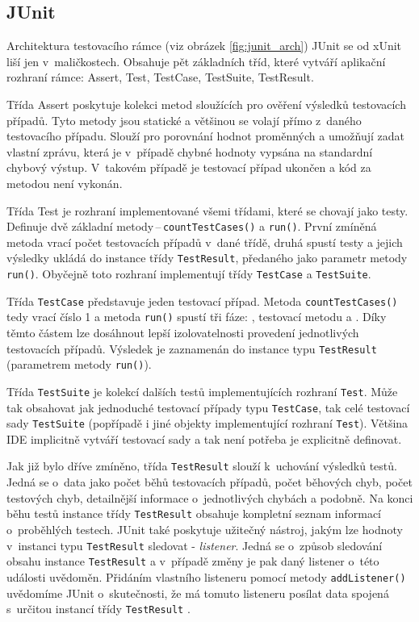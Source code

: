     \subsection{JUnit}
    \label{section:JUnit}
    Architektura testovacího rámce (viz obrázek \ref{fig:junit_arch}) JUnit se od xUnit liší jen v~maličkostech. Obsahuje pět základních tříd, které vytváří aplikační rozhraní rámce: Assert, Test, TestCase, TestSuite, TestResult.

    Třída Assert poskytuje kolekci metod sloužících pro ověření výsledků testovacích případů. Tyto metody jsou statické a většinou se volají přímo z~daného testovacího případu. Slouží pro porovnání hodnot proměnných a umožňují zadat vlastní zprávu, která je v~případě chybné hodnoty vypsána na standardní chybový výstup. V~takovém případě je testovací případ ukončen a kód za metodou není vykonán.

    Třída Test je rozhraní implementované všemi třídami, které se chovají jako testy. Definuje dvě základní metody\,--\,\texttt{countTestCases()} a \texttt{run()}. První zmíněná metoda vrací počet testovacích případů v~dané třídě, druhá spustí testy a jejich výsledky ukládá do instance třídy \texttt{TestResult}, předaného jako parametr metody \texttt{run()}. Obyčejně toto rozhraní implementují třídy \texttt{TestCase} a \texttt{TestSuite}.

    Třída \texttt{TestCase} představuje jeden testovací případ. Metoda \texttt{countTestCases()} tedy vrací číslo 1 a metoda \texttt{run()} spustí tři fáze: , testovací metodu a . Díky těmto částem lze dosáhnout lepší izolovatelnosti provedení jednotlivých testovacích případů. Výsledek je zaznamenán do instance typu \texttt{TestResult} (parametrem metody \texttt{run()}).

    Třída \texttt{TestSuite} je kolekcí dalších testů implementujících rozhraní \texttt{Test}. Může tak obsahovat jak jednoduché testovací případy typu \texttt{TestCase}, tak celé testovací sady \texttt{TestSuite} (popřípadě i jiné objekty implementující rozhraní \texttt{Test}). Většina IDE implicitně vytváří testovací sady a tak není potřeba je explicitně definovat.

    Jak již bylo dříve zmíněno, třída \texttt{TestResult} slouží k~uchování výsledků testů. Jedná se o~data jako počet běhů testovacích případů, počet běhových chyb, počet testových chyb, detailnější informace o~jednotlivých chybách a podobně. Na konci běhu testů instance třídy \texttt{TestResult} obsahuje kompletní seznam informací o~proběhlých testech. JUnit také poskytuje užitečný nástroj, jakým lze hodnoty v~instanci typu \texttt{TestResult} sledovat - \emph{listener}. Jedná se o~způsob sledování obsahu instance \texttt{TestResult} a v~případě změny je pak daný listener o~této události uvědoměn. Přidáním vlastního listeneru pomocí metody \texttt{addListener()} uvědomíme JUnit o~skutečnosti, že má tomuto listeneru posílat data spojená s~určitou instancí třídy \texttt{TestResult} \cite{JUnitGuide}.

